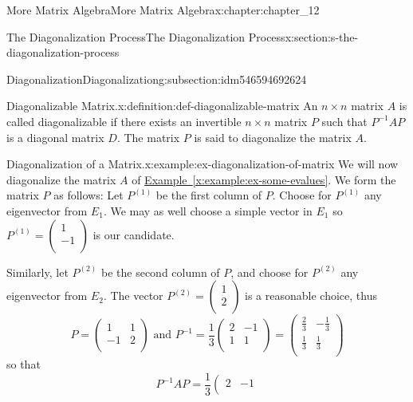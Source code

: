 \documentclass[oneside,10pt,]{book}
\newcommand{\xreffont}{\relax}
\numberwithin{equation}{section}
\begin{document}
\begin{chapterptx}{More Matrix Algebra}{}{More Matrix Algebra}{}{}{x:chapter:chapter_12}
\begin{sectionptx}{The Diagonalization Process}{}{The Diagonalization Process}{}{}{x:section:s-the-diagonalization-process}
\begin{subsectionptx}{Diagonalization}{}{Diagonalization}{}{}{g:subsection:idm546594692624}
\begin{definition}{Diagonalizable Matrix.}{x:definition:def-diagonalizable-matrix}%
%
An \(n\times n\) matrix \(A\) is called diagonalizable if there exists an invertible \(n\times n\) matrix \(P\) such that \(P^{-1} A P\) is a diagonal matrix \(D\). The matrix \(P\) is said to diagonalize the matrix \(A\).%
\end{definition}
\begin{example}{Diagonalization of a Matrix.}{x:example:ex-diagonalization-of-matrix}%
We will now diagonalize the matrix \(A\) of \hyperref[x:example:ex-some-evalues]{Example~{\xreffont\ref{x:example:ex-some-evalues}}}.  We form the matrix \(P\) as follows: Let \(P^{(1)}\) be the first column of \(P\).  Choose for \(P^{(1)}\) any eigenvector from \(E_1\). We may as well choose a simple vector in \(E_1\) so \(P^{(1)}=\left(
\begin{array}{c}
1 \\
-1 \\
\end{array}
\right)\) is our candidate.%
\par
Similarly, let \(P^{(2)}\)  be the second column of \(P\), and choose for \(P^{(2)}\) any eigenvector from \(E_2\). The vector \(P^{(2)}=\left(
\begin{array}{c}
1 \\
2 \\
\end{array}
\right)\)  is a  reasonable choice, thus%
\begin{equation*}
P= \left(
\begin{array}{cc}
1 & 1 \\
-1 & 2 \\
\end{array}
\right)    \textrm{ and }	  P^{-1}= \frac{1}{3}\left(
\begin{array}{cc}
2 & -1 \\
1 & 1 \\
\end{array}
\right)=\left(
\begin{array}{cc}
\frac{2}{3} & -\frac{1}{3} \\
\frac{1}{3} & \frac{1}{3} \\
\end{array}
\right)
\end{equation*}
so that%
\begin{equation*}
P^{-1} A P = \frac{1}{3}\left(
\begin{array}{cc}
2 & -1 \\

\end{array}
\end{equation*}
\end{example}
\end{subsectionptx}
\end{sectionptx}
\end{chapterptx}
\end{document}
